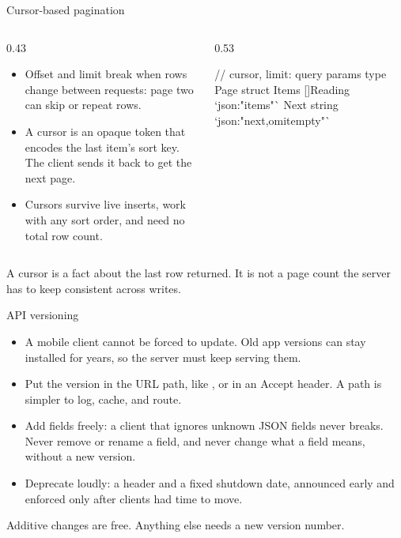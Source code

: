 \documentclass[10pt,aspectratio=169,t]{beamer}
\begin{document}
\begin{frame}[fragile,eyebrow=API design]{Cursor-based pagination}
  \begin{columns}[T]
    \begin{column}{0.43\textwidth}
      \begin{itemize}
        \item Offset and limit break when rows change between requests: page two can skip or repeat rows.
        \item A cursor is an opaque token that encodes the last item's sort key. The client sends it back to get the next page.
        \item Cursors survive live inserts, work with any sort order, and need no total row count.
      \end{itemize}
    \end{column}
    \begin{column}{0.53\textwidth}
\begin{golang}
// cursor, limit: query params
type Page struct {
    Items []Reading `json:"items"`
    Next  string `json:"next,omitempty"`
}
\end{golang}
    \end{column}
  \end{columns}
  \begin{takeaway}{A cursor is a fact about the last row returned.}
    It is not a page count the server has to keep consistent across writes.
  \end{takeaway}
\end{frame}

\begin{frame}[eyebrow=API design]{API versioning}
  \vskip 1mm
  \begin{itemize}
    \item A mobile client cannot be forced to update. Old app versions can stay installed for years, so the server must keep serving them.
    \item Put the version in the URL path, like , or in an Accept header. A path is simpler to log, cache, and route.
    \item Add fields freely: a client that ignores unknown JSON fields never breaks. Never remove or rename a field, and never change what a field means, without a new version.
    \item Deprecate loudly: a  header and a fixed shutdown date, announced early and enforced only after clients had time to move.
  \end{itemize}
  \begin{takeaway}{Additive changes are free.}
    Anything else needs a new version number.
  \end{takeaway}
\end{frame}
\end{document}
